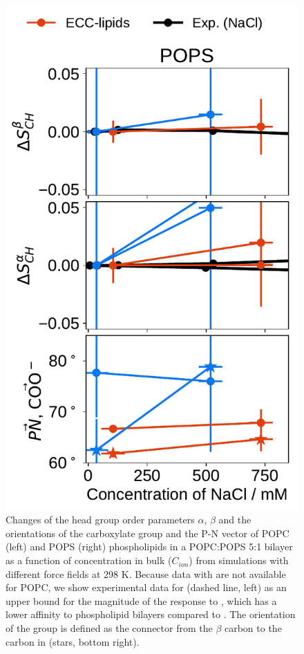 \begin{figure}[tbp!]
  \includegraphics[width=\figwidthsmall]{../img/ecc_pops/order_parameters_changes_ecc-lip_L14_A-B-PN-COO_POPS_nacl.pdf} 
  \caption{\label{fig:delta_ordPar_NaCl_PCPS} 
    Changes of the head group order parameters $\alpha$, $\beta$ and the orientations of the carboxylate group and the P-N vector  
    of POPC (left) and POPS (right) phospholipids in a POPC:POPS 5:1 bilayer as a function of  concentration 
    in bulk ($C_{ion}$) from simulations with different force fields at 298 K.
    Because data with  are not available for POPC, 
    we show experimental data for  (dashed line, left) \citep{roux90}
    as an upper bound for the magnitude of the response to , 
    which has a lower affinity to phospholipid bilayers compared to . 
    The orientation of the  group is defined as 
    the connector from the $\beta$ carbon to the carbon in  (stars, bottom right). 
  } 
\end{figure} 


